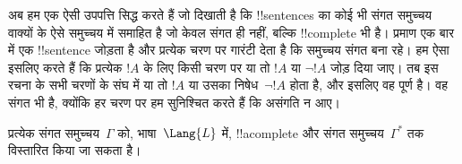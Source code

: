 \documentclass[../../../include/open-logic-section]{subfiles}
\begin{document}
      {}
      {}


\begin{explain}
अब हम एक ऐसी उपपत्ति सिद्ध करते हैं जो दिखाती है कि !!{sentence}s का कोई भी
संगत समुच्चय वाक्यों के ऐसे समुच्चय में समाहित है जो केवल संगत ही नहीं,
बल्कि !!{complete} भी है। प्रमाण एक बार में एक !!{sentence} जोड़ता है और
प्रत्येक चरण पर गारंटी देता है कि समुच्चय संगत बना रहे। हम ऐसा इसलिए करते
हैं कि प्रत्येक $!A$ के लिए किसी चरण पर या तो $!A$ या $\lnot
!A$ जोड़ दिया जाए। तब इस रचना के सभी चरणों के संघ में या तो $!A$ या उसका
निषेध~$\lnot !A$ होता है, और इसलिए वह पूर्ण है। वह संगत भी है, क्योंकि हर
चरण पर हम सुनिश्चित करते हैं कि असंगति न आए।
\end{explain}

\begin{lem}[लिंडेनबाउम उपपत्ति]
 प्रत्येक संगत समुच्चय~$\Gamma$ को, भाषा~$\Lang{L}$
में, !!a{complete} और संगत समुच्चय~$\Gamma^*$ तक विस्तारित
किया जा सकता है।
\end{lem}
\end{document}
